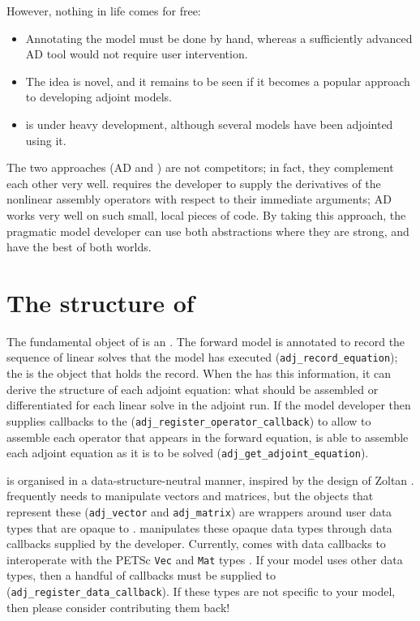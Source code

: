 However, nothing in life comes for free:
\begin{itemize}
\item Annotating the model must be done by hand, whereas a sufficiently advanced
AD tool would not require user intervention.
\item The idea is novel, and it remains to be seen if it becomes a popular approach
to developing adjoint models.
\item \libadjoint is under heavy development, although several models have been adjointed
using it.
\end{itemize}

The two approaches (AD and \libadjoint) are not competitors; in fact, they complement each
other very well. \libadjoint requires
the developer to supply the derivatives of the nonlinear assembly operators with respect to
their immediate arguments; AD works very well on such small, local pieces of code. By taking
this approach, the pragmatic model developer can use both abstractions where they are strong,
and have the best of both worlds.

\section{The structure of \libadjoint}
The fundamental object of \libadjoint is an \adjointer. The forward model is annotated
to record the sequence of linear solves that the model has executed (\texttt{adj\_record\_equation}); the \adjointer is
the object that holds the record. When the \adjointer has this information, it can derive
the structure of each adjoint equation: what should be assembled or differentiated for each linear
solve in the adjoint run. If the model developer then
supplies callbacks to the \adjointer (\texttt{adj\_register\_operator\_callback}) to allow \libadjoint to assemble each
operator that appears in the forward equation, \libadjoint is
able to assemble each adjoint equation as it is to be solved (\texttt{adj\_get\_adjoint\_equation}).

\libadjoint is organised in a data-structure-neutral manner, inspired by the design
of Zoltan \citep{devine2002}. \libadjoint frequently needs to manipulate vectors
and matrices, but the objects that represent these (\texttt{adj\_vector} and \texttt{adj\_matrix})
are wrappers around user data types that are opaque to \libadjoint. \libadjoint manipulates
these opaque data types through data callbacks supplied by the developer. Currently, \libadjoint
comes with data callbacks to interoperate with the PETSc \texttt{Vec} and \texttt{Mat} types \citep{balay2010}.
If your model uses other data types, then a handful of callbacks must be supplied to \libadjoint (\texttt{adj\_register\_data\_callback}).
If these types are not specific to your model, then please consider contributing them back!

